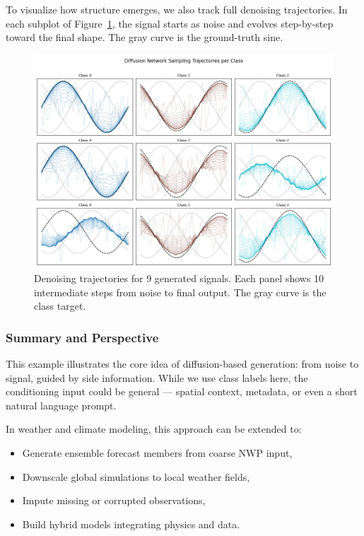 To visualize how structure emerges, we also track full denoising trajectories. In each subplot of Figure~\ref{fig:step-by-step}, the signal starts as noise and evolves step-by-step toward the final shape. The gray curve is the ground-truth sine.

\begin{figure}[h]
\centering
\includegraphics[width=\textwidth]{images/diffusion_network_sampling.png}
\caption{Denoising trajectories for 9 generated signals. Each panel shows 10 intermediate steps from noise to final output. The gray curve is the class target.}
\label{fig:step-by-step}
\end{figure}

\subsubsection*{Summary and Perspective}

This example illustrates the core idea of diffusion-based generation: from noise to signal, guided by side information. While we use class labels here, the conditioning input could be general — spatial context, metadata, or even a short natural language prompt.

In weather and climate modeling, this approach can be extended to:
\begin{itemize}
    \item Generate ensemble forecast members from coarse NWP input,
    \item Downscale global simulations to local weather fields,
    \item Impute missing or corrupted observations,
    \item Build hybrid models integrating physics and data.
\end{itemize}

